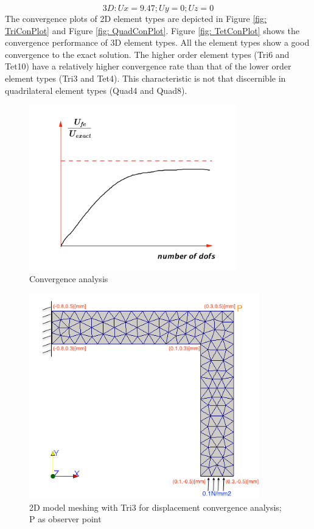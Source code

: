 \begin{equation*}
3D: Ux = 9.47; Uy = 0; Uz = 0
\end{equation*}
The convergence plots of 2D element types are depicted in Figure \ref{fig: TriConPlot} and Figure \ref{fig: QuadConPlot}. Figure \ref{fig: TetConPlot} shows the convergence performance of 3D element types. All the element types show a good convergence to the exact solution. The higher order element types (Tri6 and Tet10) have a relatively higher convergence rate than that of the lower order element types (Tri3 and Tet4). This characteristic is not that discernible in quadrilateral element types (Quad4 and Quad8). 

\begin{figure}[htbp]
	\begin{center}	
		\includegraphics[width=9cm,clip]{convergence.pdf} 			
		\caption{Convergence analysis} \label{fig: convergence}
	\end{center}
\end{figure}


\begin{figure}[htbp]
	\begin{center}	
		\includegraphics[width=10cm,clip]{Convergence2D.png} 			
		\caption{2D model meshing with Tri3 for displacement convergence analysis; P as observer point} \label{fig: Convergence2D}
	\end{center}
\end{figure}

